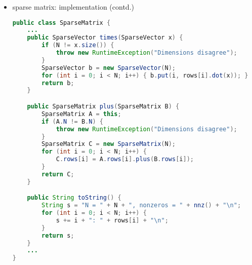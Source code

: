\documentclass[8pt,a4paper,compress]{beamer}
\begin{document}
\begin{frame}[fragile]
\begin{itemize}
\item sparse matrix: implementation (contd.)
\begin{lstlisting}[language=Java]
public class SparseMatrix {
    ...
    public SparseVector times(SparseVector x) {
        if (N != x.size()) {
            throw new RuntimeException("Dimensions disagree");
        }
        SparseVector b = new SparseVector(N);
        for (int i = 0; i < N; i++) { b.put(i, rows[i].dot(x)); }
        return b;
    }

    public SparseMatrix plus(SparseMatrix B) {
        SparseMatrix A = this;
        if (A.N != B.N) { 
            throw new RuntimeException("Dimensions disagree"); 
        }
        SparseMatrix C = new SparseMatrix(N);
        for (int i = 0; i < N; i++) { 
            C.rows[i] = A.rows[i].plus(B.rows[i]); 
        }
        return C;
    }

    public String toString() {
        String s = "N = " + N + ", nonzeros = " + nnz() + "\n";
        for (int i = 0; i < N; i++) {
            s += i + ": " + rows[i] + "\n";
        }
        return s;
    }
    ...
}
\end{lstlisting}
\end{itemize}
\end{frame}
\end{document}
